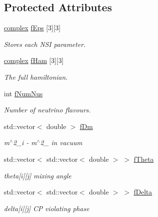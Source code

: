 \subsection*{Protected Attributes}
\begin{DoxyCompactItemize}
\item 
\hyperlink{classOscProb_1_1PMNS__Base_ae86ec4718808ce9d02e5f5b4226714ab}{complex} \hyperlink{classOscProb_1_1PMNS__NSI_a7e2f0a3fdc633f68523c9de0ce76e67d}{f\+Eps} \mbox{[}3\mbox{]}\mbox{[}3\mbox{]}
\begin{DoxyCompactList}\small\item\em Stores each N\+SI parameter. \end{DoxyCompactList}\item 
\hyperlink{classOscProb_1_1PMNS__Base_ae86ec4718808ce9d02e5f5b4226714ab}{complex} \hyperlink{classOscProb_1_1PMNS__Fast_aab37f2a7f59ab7026a8a21a561115dd0}{f\+Ham} \mbox{[}3\mbox{]}\mbox{[}3\mbox{]}
\begin{DoxyCompactList}\small\item\em The full hamiltonian. \end{DoxyCompactList}\item 
int \hyperlink{classOscProb_1_1PMNS__Base_a24bb74bed63569dfe88b18fa6a08060e}{f\+Num\+Nus}
\begin{DoxyCompactList}\small\item\em Number of neutrino flavours. \end{DoxyCompactList}\item 
std\+::vector$<$ double $>$ \hyperlink{classOscProb_1_1PMNS__Base_a406a31c3b5d620e5a0cace5b411f9f70}{f\+Dm}
\begin{DoxyCompactList}\small\item\em m$^\wedge$2\+\_\+i -\/ m$^\wedge$2\+\_ in vacuum \end{DoxyCompactList}\item 
std\+::vector$<$ std\+::vector$<$ double $>$ $>$ \hyperlink{classOscProb_1_1PMNS__Base_a1976887cd658dd86b2336c181f1470b4}{f\+Theta}
\begin{DoxyCompactList}\small\item\em theta\mbox{[}i\mbox{]}\mbox{[}j\mbox{]} mixing angle \end{DoxyCompactList}\item 
std\+::vector$<$ std\+::vector$<$ double $>$ $>$ \hyperlink{classOscProb_1_1PMNS__Base_ab2a5fa40e689b221c8a7d2c17213810d}{f\+Delta}
\begin{DoxyCompactList}\small\item\em delta\mbox{[}i\mbox{]}\mbox{[}j\mbox{]} CP violating phase \end{DoxyCompactList}\item 

\end{DoxyCompactItemize}
